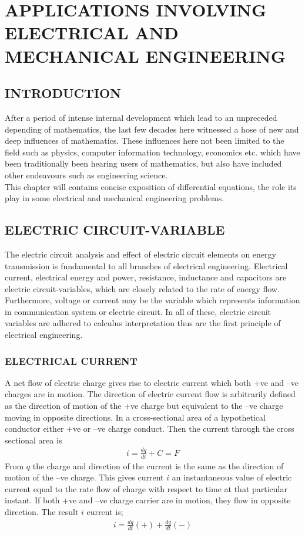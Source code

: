 \documentclass[11pt]{report}
\newcommand{\sps}{\\[0.2cm]}
\newcommand{\NI}{\noindent}
\begin{document}
	
	\chapter{APPLICATIONS INVOLVING ELECTRICAL AND MECHANICAL ENGINEERING}
	\section{INTRODUCTION}
	After a period of intense internal development which lead to an unpreceded depending of mathematics, the last few decades here witnessed a hose of new and deep influences of mathematics. These influences here not been limited to the field such as physics, computer information technology, economics etc. which have been traditionally been hearing users of mathematics, but also have included other endeavours such as engineering science.\sps 
	
	\NI This chapter will contains concise exposition of differential equations, the role its play in some electrical and mechanical engineering problems.
	
	\section{ELECTRIC CIRCUIT-VARIABLE}
	The electric circuit analysis and effect of electric circuit elements on energy transmission is fundamental to all branches of electrical engineering. Electrical current, electrical energy and power, resistance, inductance and capacitors are electric circuit-variables, which are closely related to the rate of energy flow. Furthermore, voltage or current may be the variable which represents information in communication system or electric circuit. In all of these, electric circuit variables are adhered to calculus interpretation thus are the first principle of electrical engineering. 
	\subsection{ELECTRICAL CURRENT}
	A net flow of electric charge gives rise to electric current which both +ve and –ve charges are in motion. The direction of electric current flow is arbitrarily defined as the direction of motion of the +ve charge but equivalent to the –ve charge moving in opposite directions. In a cross-sectional area of a hypothetical conductor either +ve or –ve charge conduct. Then the current through the cross sectional area is
	\begin{eqnarray}
		i = \frac{dq}{dt} + C = F\label{eq:4_1}
	\end{eqnarray}
	From $q$ the charge and direction of the current is the same as the direction of motion of the –ve charge. This gives current $i$ an instantaneous value of electric current equal to the rate flow of charge with respect to time at that particular instant. If both +ve and –ve charge carrier are in motion, they flow in opposite direction. The result $i$ current is;
	\begin{eqnarray}
		i = \frac{dq}{dt}(+) + \frac{dq}{dt}(-)\label{eq:4_2}
	\end{eqnarray}
	
\end{document}
